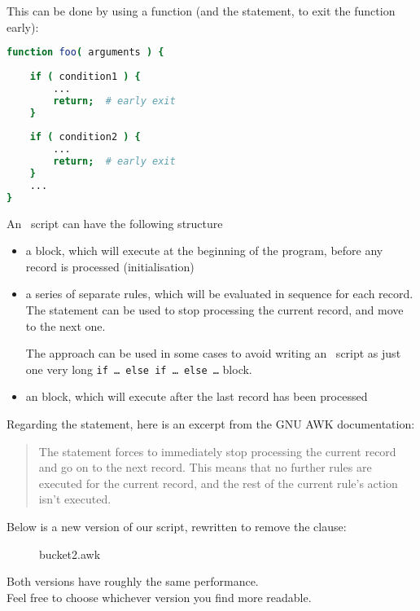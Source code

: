 This can be done by using a function (and the  statement, to exit the function early):
\begin{lstlisting}[language=sh]
function foo( arguments ) {
	
	if ( condition1 ) {
		...
		return;  # early exit
	}
	
	if ( condition2 ) {
		...
		return;  # early exit
	}
	...
}
\end{lstlisting}

\bigskip


An \awk\ script can have the following structure

\begin{itemize}
	\item a  block, which will execute at the beginning of the program, before any record is processed (initialisation)
	\item a series of separate rules, which will be evaluated in sequence for each record.
	The  statement can be used to stop processing the current record, and move to the next one.
	
	The approach can be used in some cases to avoid writing an \awk\ script as just one very long \texttt{if \dots\ else if \dots\ else \dots} block.
	
	\item an  block, which will execute after the last record has been processed
\end{itemize}



\medskip


Regarding the  statement, here is an excerpt from the GNU AWK documentation:
\begin{quote}
	The  statement forces  to immediately stop processing the current record and go on to the next record. This means that no further rules are executed for the current record, and the rest of the current rule's action isn't executed. \citep{gawk-next}
\end{quote}

\newpage
Below is a new version of our script, rewritten to remove the  clause:

\begin{figure}[h]
	\caption{bucket2.awk}
	
\end{figure}


Both versions have roughly the same performance. \\
Feel free to choose whichever version you find more readable.
